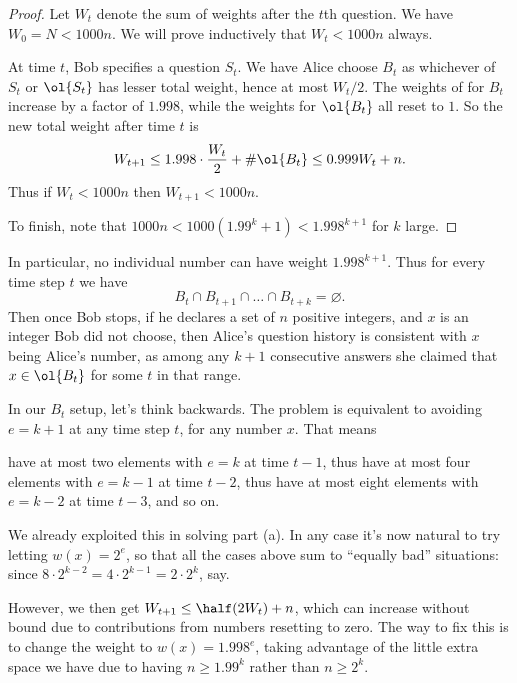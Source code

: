 \begin{proof}
  Let $W_{t}$ denote the sum of weights after the $t$th question.
  We have $W_0 = N < 1000n$.
  We will prove inductively that $W_t < 1000n$ always.

  At time $t$, Bob specifies a question $S_t$.
  We have Alice choose $B_t$ as whichever of $S_t$ or $\ol{S_t}$
  has lesser total weight, hence at most $W_t/2$.
  The weights of for $B_t$ increase by a factor of $1.998$,
  while the weights for $\ol{B_t}$ all reset to $1$.
  So the new total weight after time $t$ is
  \[ W_{t+1} \le 1.998 \cdot \frac{W_t}{2}
    + \# \ol{B_t} \le 0.999 W_t + n. \]
  Thus if $W_t < 1000n$ then $W_{t+1} < 1000n$.

  To finish, note that
  $1000n < 1000 \left( 1.99^k + 1 \right) < 1.998^{k+1}$
  for $k$ large.
\end{proof}

In particular, no individual number can have weight $1.998^{k+1}$.
Thus for every time step $t$ we have
\[ B_t \cap B_{t+1} \cap \dots \cap B_{t+k} = \varnothing. \]
Then once Bob stops, if he declares a set of $n$ positive integers,
and $x$ is an integer Bob did not choose,
then Alice's question history is consistent with $x$ being Alice's number,
as among any $k+1$ consecutive answers
she claimed that $x \in \ol{B_t}$ for some $t$ in that range.

\begin{remark*}
  [Motivation]
  In our $B_t$ setup, let's think backwards.
  The problem is equivalent to avoiding $e = k+1$ at any time step $t$,
  for any number $x$.
  That means
  \begin{itemize}
    \ii have at most two elements with $e = k$ at time $t-1$,
    \ii thus have at most four elements with $e = k-1$ at time $t-2$,
    \ii thus have at most eight elements with $e = k-2$ at time $t-3$,
    \ii and so on.
  \end{itemize}
  We already exploited this in solving part (a).
  In any case it's now natural to try letting $w(x) = 2^e$,
  so that all the cases above sum to ``equally bad'' situations:
  since $8 \cdot 2^{k-2} = 4 \cdot 2^{k-1} = 2 \cdot 2^k$, say.

  However, we then get $W_{t+1} \le \half (2W_t) + n$,
  which can increase without bound due to contributions
  from numbers resetting to zero.
  The way to fix this is to change the weight to $w(x) = 1.998^e$,
  taking advantage of the little extra space we have
  due to having $n \ge 1.99^k$ rather than $n \ge 2^k$.
\end{remark*}

